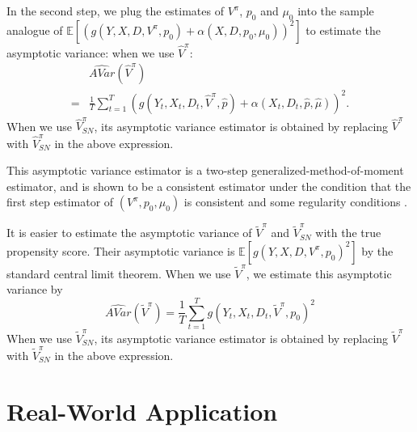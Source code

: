 \documentclass[letterpaper]{article} \usepackage{aaai19}  \usepackage{times}  \usepackage{helvet}  \usepackage{courier}  \usepackage{url}  \usepackage{graphicx}  \frenchspacing  \usepackage{comment}
\begin{document}
In the second step, we plug the estimates of $V^\pi$, $p_0$ and $\mu_0$ into the sample analogue of $\mathbb{E}[(g(Y,X,D,V^\pi,p_0)+\alpha(X,D,p_0,\mu_0))^2]$ to estimate the asymptotic variance: when we use $\hat V^\pi$:
\begin{align*}
&\widehat {AVar}(\hat V^\pi)\\
 =& \frac{1}{T}\sum_{t=1}^T(g(Y_t,X_t,D_t,\hat V^\pi,\hat p)+\alpha(X_t,D_t,\hat p,\hat \mu))^2.
\end{align*}
When we use $\hat V^\pi_{SN}$, its asymptotic variance estimator is obtained by replacing $\hat V^\pi$ with $\hat V^\pi_{SN}$ in the above expression.


This asymptotic variance estimator is a two-step generalized-method-of-moment estimator, and is shown to be a consistent estimator under the condition that the first step estimator of $(V^\pi, p_0,\mu_0)$ is consistent and some regularity conditions \cite{Newey1994}.

It is easier to estimate the asymptotic variance of $\tilde V^\pi$ and $\tilde V^\pi_{SN}$ with the true propensity score. 
Their asymptotic variance is $\mathbb{E}[g(Y,X,D,V^\pi,p_0)^2]$ by the standard central limit theorem.
When we use $\tilde V^\pi$, we estimate this asymptotic variance by
$$
\widehat {AVar}(\tilde V^\pi) = \frac{1}{T}\sum_{t=1}^Tg(Y_t,X_t,D_t,\tilde V^\pi,p_0)^2
$$
When we use $\tilde V^\pi_{SN}$, its asymptotic variance estimator is obtained by replacing $\tilde V^\pi$ with $\tilde V^\pi_{SN}$ in the above expression.




\section{Real-World Application}
\end{document}
